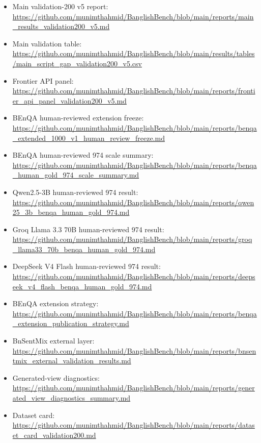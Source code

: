\begin{itemize}
\item Main validation-200 v5 report:
\url{https://github.com/munimthahmid/BanglishBench/blob/main/reports/main_results_validation200_v5.md}

\item Main validation table:
\url{https://github.com/munimthahmid/BanglishBench/blob/main/results/tables/main_script_gap_validation200_v5.csv}

\item Frontier API panel:
\url{https://github.com/munimthahmid/BanglishBench/blob/main/reports/frontier_api_panel_validation200_v5.md}

\item BEnQA human-reviewed extension freeze:
\url{https://github.com/munimthahmid/BanglishBench/blob/main/reports/benqa_extended_1000_v1_human_review_freeze.md}

\item BEnQA human-reviewed 974 scale summary:
\url{https://github.com/munimthahmid/BanglishBench/blob/main/reports/benqa_human_gold_974_scale_summary.md}

\item Qwen2.5-3B human-reviewed 974 result:
\url{https://github.com/munimthahmid/BanglishBench/blob/main/reports/qwen25_3b_benqa_human_gold_974.md}

\item Groq Llama 3.3 70B human-reviewed 974 result:
\url{https://github.com/munimthahmid/BanglishBench/blob/main/reports/groq_llama33_70b_benqa_human_gold_974.md}

\item DeepSeek V4 Flash human-reviewed 974 result:
\url{https://github.com/munimthahmid/BanglishBench/blob/main/reports/deepseek_v4_flash_benqa_human_gold_974.md}

\item BEnQA extension strategy:
\url{https://github.com/munimthahmid/BanglishBench/blob/main/reports/benqa_extension_publication_strategy.md}

\item BnSentMix external layer:
\url{https://github.com/munimthahmid/BanglishBench/blob/main/reports/bnsentmix_external_validation_results.md}

\item Generated-view diagnostics:
\url{https://github.com/munimthahmid/BanglishBench/blob/main/reports/generated_view_diagnostics_summary.md}

\item Dataset card:
\url{https://github.com/munimthahmid/BanglishBench/blob/main/reports/dataset_card_validation200.md}

\end{itemize}

